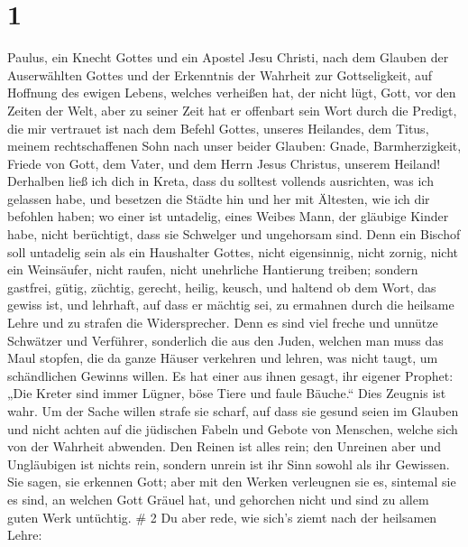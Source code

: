\hypertarget{section}{%
\section{1}\label{section}}

 Paulus, ein Knecht Gottes und ein Apostel Jesu Christi,
nach dem Glauben der Auserwählten Gottes und der Erkenntnis der Wahrheit
zur Gottseligkeit,  auf Hoffnung des ewigen Lebens, welches
verheißen hat, der nicht lügt, Gott, vor den Zeiten der Welt,
 aber zu seiner Zeit hat er offenbart sein Wort durch die
Predigt, die mir vertrauet ist nach dem Befehl Gottes, unseres
Heilandes,  dem Titus, meinem rechtschaffenen Sohn nach
unser beider Glauben: Gnade, Barmherzigkeit, Friede von Gott, dem Vater,
und dem Herrn Jesus Christus, unserem Heiland!  Derhalben
ließ ich dich in Kreta, dass du solltest vollends ausrichten, was ich
gelassen habe, und besetzen die Städte hin und her mit Ältesten, wie ich
dir befohlen haben;  wo einer ist untadelig, eines Weibes
Mann, der gläubige Kinder habe, nicht berüchtigt, dass sie Schwelger und
ungehorsam sind.  Denn ein Bischof soll untadelig sein als
ein Haushalter Gottes, nicht eigensinnig, nicht zornig, nicht ein
Weinsäufer, nicht raufen, nicht unehrliche Hantierung treiben;
 sondern gastfrei, gütig, züchtig, gerecht, heilig, keusch,
 und haltend ob dem Wort, das gewiss ist, und lehrhaft, auf
dass er mächtig sei, zu ermahnen durch die heilsame Lehre und zu strafen
die Widersprecher.  Denn es sind viel freche und unnütze
Schwätzer und Verführer, sonderlich die aus den Juden, 
welchen man muss das Maul stopfen, die da ganze Häuser verkehren und
lehren, was nicht taugt, um schändlichen Gewinns willen. 
Es hat einer aus ihnen gesagt, ihr eigener Prophet: „Die Kreter sind
immer Lügner, böse Tiere und faule Bäuche.``  Dies Zeugnis
ist wahr. Um der Sache willen strafe sie scharf, auf dass sie gesund
seien im Glauben  und nicht achten auf die jüdischen Fabeln
und Gebote von Menschen, welche sich von der Wahrheit abwenden.
 Den Reinen ist alles rein; den Unreinen aber und
Ungläubigen ist nichts rein, sondern unrein ist ihr Sinn sowohl als ihr
Gewissen.  Sie sagen, sie erkennen Gott; aber mit den
Werken verleugnen sie es, sintemal sie es sind, an welchen Gott Gräuel
hat, und gehorchen nicht und sind zu allem guten Werk untüchtig. \# 2
 Du aber rede, wie sich's ziemt nach der heilsamen Lehre:
